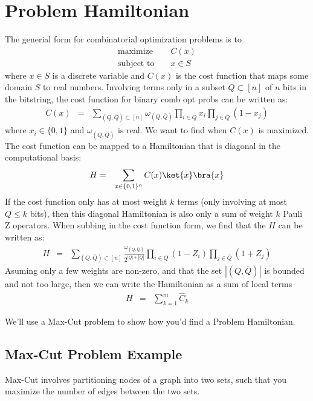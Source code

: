 \documentclass[preprint,aps,prd,nofootinbib,superscriptaddress]{revtex4-2}
\begin{document}
\section{Problem Hamiltonian}
%
The generial form for combinatorial optimization problems is to 
%
\begin{eqnarray}
\text{maximize } && C(x)
\nonumber \\
\text{subject to } && x \in S
\end{eqnarray}
%
where $x \in S$ is a discrete variable and $C(x)$ is the cost function that maps some domain $S$ to real numbers. Involving terms only in a subset $Q\subset [n]$ of $n$ bits in the bitstring, the cost function for binary comb opt probs can be written as:
%
\begin{eqnarray}
C(x) &=& \sum \limits _{(Q,\bar{Q}) \subset [n]} \omega_{(Q,\bar{Q})} \prod \limits _{i \in Q} x_i \prod \limits _{j \in \bar{Q}} (1-x_j)
\end{eqnarray}
%
where $x_i \in \lbrace 0,1 \rbrace$ and $\omega_{(Q,\bar{Q})}$ is real. We want to find when $C(x)$ is maximized. The cost function can be mapped to a Hamiltonian that is diagonal in the computational basis:
%
\begin{eqnarray}
H &=& \sum \limits _{x \in \lbrace 0,1 \rbrace ^n} C(x) \ket{x} \bra{x}
\end{eqnarray}
%
If the cost function only has at most weight $k$ terms (only involving at most $Q\leq k$ bits), then this diagonal Hamiltonian is also only a sum of weight $k$ Pauli Z operators. When subbing in the cost function form, we find that the $H$ can be written as:
%
\begin{eqnarray}
H &=& \sum \limits _{(Q,\bar{Q}) \subset [n]} \frac{\omega_{(Q,\bar{Q})}}{2^{|Q| + |\bar{Q}|}}\prod \limits _{i \in Q} (1 - Z_i) \prod \limits _{j \in \bar{Q}} (1 + Z_j)
\end{eqnarray}
%
Asuming only a few weights are non-zero, and that the set $|(Q, \bar{Q})|$ is bounded and not too large, then we can write the Hamiltonian as a sum of local terms
%
\begin{eqnarray}
H &=& \sum \limits _{k=1} ^m \hat{C}_k
\end{eqnarray}
%

We'll use a Max-Cut problem to show how you'd find a Problem Hamiltonian.

\subsection{Max-Cut Problem Example}
%
Max-Cut involves partitioning nodes of a graph into two sets, such that you maximize the number of edges between the two sets. 
%
\end{document}

